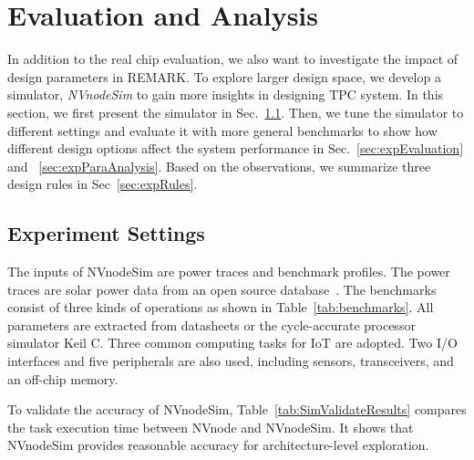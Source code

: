 \section{Evaluation and Analysis} \label{sec:evaluation}
%
In addition to the real chip evaluation, we also want to investigate the impact of design parameters in REMARK.
To explore larger design space, we develop a simulator, \emph{NVnodeSim} to gain more insights in designing TPC system.
In this section, we first present the simulator in Sec.~\ref{sec:expSettings}. 
Then, we tune the simulator to different settings and evaluate it with more general benchmarks to show how different design options affect the system performance in Sec.~\ref{sec:expEvaluation} and ~\ref{sec:expParaAnalysis}. 
Based on the observations, we summarize three design rules in Sec~\ref{sec:expRules}. 

\subsection{Experiment Settings} \label{sec:expSettings}
The inputs of NVnodeSim are power traces and benchmark profiles.
The power traces are solar power data from an open source database~\cite{midc2015solar}.
The benchmarks consist of three kinds of operations as shown in Table~\ref{tab:benchmarks}.
All parameters are extracted from datasheets or the cycle-accurate processor simulator Keil C.
Three common computing tasks for IoT are adopted.
Two I/O interfaces and five peripherals are also used, including sensors, transceivers, and an off-chip memory.



%
To validate the accuracy of NVnodeSim, Table~\ref{tab:SimValidateResults} compares the task execution time between NVnode and NVnodeSim.
It shows that NVnodeSim provides reasonable accuracy for architecture-level exploration.



